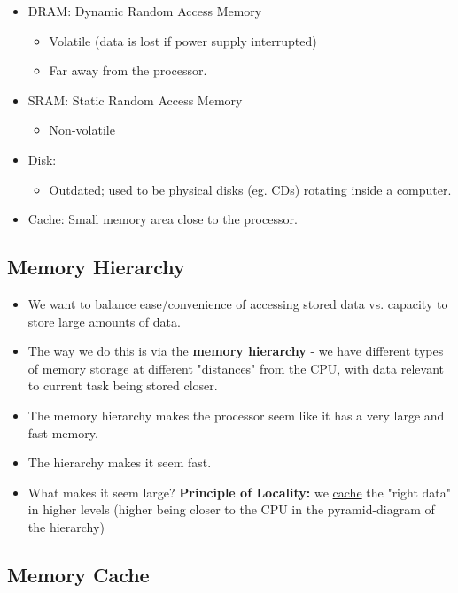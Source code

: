 \documentclass[11pt]{article}
\begin{document}
\begin{itemize}
  \item DRAM: Dynamic Random Access Memory
  \begin{itemize}
    \item Volatile (data is lost if power supply interrupted)
    \item Far away from the processor.
  \end{itemize}

  \item SRAM: Static Random Access Memory
  \begin{itemize}
    \item Non-volatile
  \end{itemize}
  
  \item Disk:
  \begin{itemize}
    \item Outdated; used to be physical disks (eg. CDs) rotating inside a computer.
  \end{itemize}
  
  \item Cache: Small memory area close to the processor.
\end{itemize}

\vskip 1cm
\subsection{Memory Hierarchy}
\begin{itemize}
  \item We want to balance ease/convenience of accessing stored data vs. capacity to store large amounts of data.
  \item The way we do this is via the \textbf{memory hierarchy} - we have different types of memory storage at different "distances" from the CPU, with data relevant to current task being stored closer.
  \item The memory hierarchy makes the processor seem like it has a very large and fast memory.
  \item The hierarchy makes it seem fast.
  \item What makes it seem large? \textbf{Principle of Locality:} we \underline{cache} the "right data" in higher levels (higher being closer to the CPU in the pyramid-diagram of the hierarchy)
\end{itemize}

\vskip 1cm
\subsection{Memory Cache}
\end{document}
